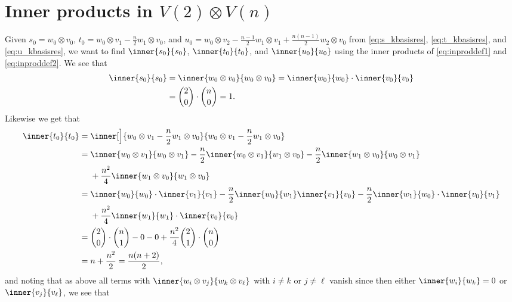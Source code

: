 \section{\texorpdfstring{Inner products in $V(2)\otimes V(n)$}{Inner products in V(2) tensor V(n)}}\label{sec:innerproductscalc}

Given $s_0=w_0\otimes v_0$, $t_0=w_0\otimes v_1 - \tfrac{n}{2}w_1\otimes v_0$, and $u_0=w_0\otimes v_2 - \tfrac{n-1}{2}w_1\otimes v_1 + \tfrac{n(n-1)}{2}w_2\otimes v_0$ from \cref{eq:s_kbasisres}, \cref{eq:t_kbasisres}, and \cref{eq:u_kbasisres}, we want to find $\inner{s_0}{s_0}$, $\inner{t_0}{t_0}$, and $\inner{u_0}{u_0}$ using the inner products of \cref{eq:inproddef1} and \cref{eq:inproddef2}. We see that
\begin{align*}
  \inner{s_0}{s_0} &= \inner{w_0\otimes v_0}{w_0\otimes v_0} = \inner{w_0}{w_0} \cdot \inner{v_0}{v_0} \\
  &= \binom{2}{0}\cdot\binom{n}{0} = 1.
\end{align*}
Likewise we get that
\begin{align*}
  \inner{t_0}{t_0} &= \inner[\Big]{w_0\otimes v_1 - \dfrac{n}{2}w_1\otimes v_0}{w_0\otimes v_1 - \dfrac{n}{2}w_1\otimes v_0} \\
                   &= \inner{w_0\otimes v_1}{w_0\otimes v_1} - \dfrac{n}{2}\inner{w_0\otimes v_1}{w_1\otimes v_0} - \dfrac{n}{2}\inner{w_1\otimes v_0}{w_0\otimes v_1} \\*
                   &\phantom{{}={}}{} + \dfrac{n^2}{4}\inner{w_1\otimes v_0}{w_1\otimes v_0} \\
                   &= \inner{w_0}{w_0}\cdot\inner{v_1}{v_1} - \dfrac{n}{2}\inner{w_0}{w_1}\inner{v_1}{v_0} - \dfrac{n}{2}\inner{w_1}{w_0}\cdot\inner{v_0}{v_1} \\*
                   &\phantom{{}={}}{} + \dfrac{n^2}{4}\inner{w_1}{w_1}\cdot\inner{v_0}{v_0} \\
                   &= \binom{2}{0}\cdot\binom{n}{1} - 0 - 0 + \dfrac{n^2}{4}\binom{2}{1}\cdot\binom{n}{0} \\
                   &= n + \dfrac{n^2}{2} = \dfrac{n(n+2)}{2},
\end{align*}
and noting that as above all terms with $\inner{w_i\otimes v_j}{w_k\otimes v_\ell}$ with $i\neq k$ or $j\neq \ell$ vanish since then either $\inner{w_i}{w_k}=0$ or $\inner{v_j}{v_\ell}$, we see that
